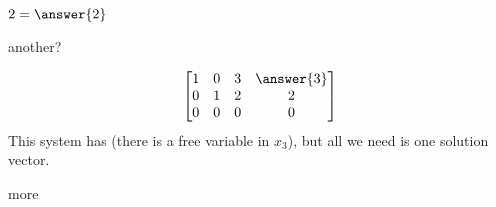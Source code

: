 \documentclass{ximera}
\begin{document}
\begin{example}
  $2 = \answer{2}$

  \begin{question}
    \begin{multipleChoice}
    \end{multipleChoice}

    \begin{feedback}[correct]
      another?
      \begin{multipleChoice}
      \end{multipleChoice} 
    \end{feedback}
  \end{question}

  \begin{question}
    \[
      \begin{bmatrix}
        1 & 0 & 3 & \answer{3}\\
        0 & 1 & 2 & 2\\
        0 & 0 & 0 & 0
      \end{bmatrix}
    \]
    This system has  (there is a free
    variable in $x_3$), but all we need is one solution vector.

    \begin{multipleChoice}
    \end{multipleChoice} 
  \end{question}

    
  \begin{question}
    \begin{multipleChoice}
    \end{multipleChoice}

    \begin{feedback}[correct]
      more
    \end{feedback}
  \end{question}

\end{example}
\end{document}
